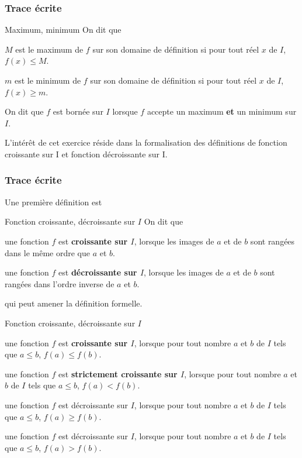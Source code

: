 \subsubsection{Trace écrite}

\begin{DefT}{Maximum, minimum}
On dit que
\begin{description}[leftmargin=*]
\item[•] $M$ est le maximum de $f$ sur son domaine de définition si pour tout réel $x$ de $I$, $f(x) \leq M$. 
\item[•] $m$ est le minimum de $f$ sur son domaine de définition si pour tout réel $x$ de $I$, $f(x) \geq m$. 
\end{description} 
On dit que $f$ est bornée  sur $I$ lorsque $f$ accepte un maximum \textbf{et} un minimum sur $I$.
\end{DefT}





L'intérêt de cet exercice réside dans la formalisation des définitions de fonction croissante sur I et fonction décroissante sur I.


\subsubsection{Trace écrite}

Une première définition est 

\begin{DefT}{Fonction croissante, décroissante sur $I$}
On dit que
\begin{description}[leftmargin=*]
\item[•] une fonction $f$ est \textbf{croissante sur $I$}, lorsque les images de $a$ et de $b$ sont rangées dans le même ordre que $a$ et $b$.
\item[•] une fonction $f$ est \textbf{décroissante sur $I$}, lorsque les images de $a$ et de $b$ sont rangées dans l'ordre inverse de $a$ et $b$.
\end{description} 
\end{DefT}

qui peut amener la définition formelle. 

\begin{DefT}{Fonction croissante, décroissante sur $I$}
\begin{description}[leftmargin=*]
\item[•] une fonction $f$ est \textbf{croissante sur $I$}, lorsque pour tout nombre $a$ et $b$ de $I$ tels que $a \leq b$, $f(a) \leq f(b)$.
\item[•] une fonction $f$ est \textbf{strictement croissante sur $I$}, lorsque pour tout nombre $a$ et $b$ de $I$ tels que $a \leq b$, $f(a) < f(b)$.
\item[•] une fonction $f$ est décroissante sur $I$, lorsque pour tout nombre $a$ et $b$ de $I$ tels que $a \leq b$, $f(a) \geq f(b)$.
\item[•] une fonction $f$ est décroissante sur $I$, lorsque pour tout nombre $a$ et $b$ de $I$ tels que $a \leq b$, $f(a) > f(b)$.
\end{description} 
\end{DefT}


